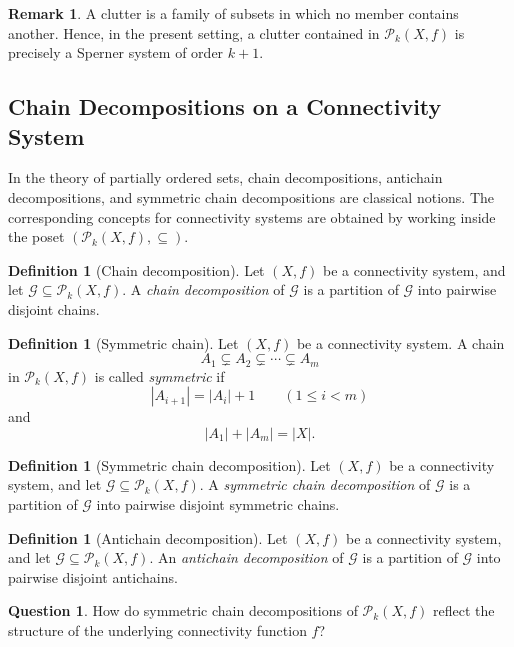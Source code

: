 \documentclass[10pt]{book}
\theoremstyle{definition}
\newtheorem{remark}[theorem]{Remark}
\newtheorem{definition}[theorem]{Definition}
\newtheorem{question}[theorem]{Question}
\begin{document}
\begin{remark}
A clutter is a family of subsets in which no member contains another.
Hence, in the present setting, a clutter contained in \(\mathcal{P}_k(X,f)\) is precisely a Sperner system of order \(k+1\).
\end{remark}

\subsection{Chain Decompositions on a Connectivity System}

In the theory of partially ordered sets, chain decompositions, antichain decompositions, and symmetric chain decompositions are classical notions.
The corresponding concepts for connectivity systems are obtained by working inside the poset \((\mathcal{P}_k(X,f),\subseteq)\).

\begin{definition}[Chain decomposition]
Let \((X,f)\) be a connectivity system, and let \(\mathcal{G}\subseteq \mathcal{P}_k(X,f)\).
A \emph{chain decomposition} of \(\mathcal{G}\) is a partition of \(\mathcal{G}\) into pairwise disjoint chains.
\end{definition}

\begin{definition}[Symmetric chain]
Let \((X,f)\) be a connectivity system.
A chain
\[
A_1 \subsetneq A_2 \subsetneq \cdots \subsetneq A_m
\]
in \(\mathcal{P}_k(X,f)\) is called \emph{symmetric} if
\[
|A_{i+1}| = |A_i|+1
\qquad (1\leq i < m)
\]
and
\[
|A_1| + |A_m| = |X|.
\]
\end{definition}

\begin{definition}[Symmetric chain decomposition]
Let \((X,f)\) be a connectivity system, and let \(\mathcal{G}\subseteq \mathcal{P}_k(X,f)\).
A \emph{symmetric chain decomposition} of \(\mathcal{G}\) is a partition of \(\mathcal{G}\) into pairwise disjoint symmetric chains.
\end{definition}

\begin{definition}[Antichain decomposition]
Let \((X,f)\) be a connectivity system, and let \(\mathcal{G}\subseteq \mathcal{P}_k(X,f)\).
An \emph{antichain decomposition} of \(\mathcal{G}\) is a partition of \(\mathcal{G}\) into pairwise disjoint antichains.
\end{definition}

\begin{question}
How do symmetric chain decompositions of \(\mathcal{P}_k(X,f)\) reflect the structure of the underlying connectivity function \(f\)?
\end{question}
\end{document}
